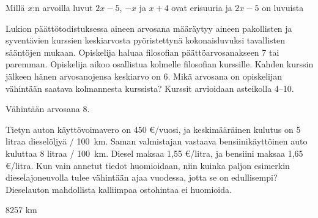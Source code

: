 \begin{tehtavasivu}
\begin{tehtava}
	Millä $x$:n arvoilla luvut $2x - 5$, $-x$ ja $x + 4$ ovat erisuuria ja $2x - 5$ on luvuista
	\begin{alakohdat}
	\end{alakohdat}
	\begin{vastaus}
		\begin{alakohdat}
			\alakohta{$x > 9$}
			\alakohta{$\frac{5}{3} < x < 9$}
			\alakohta{$x < \frac{5}{3}$}
		\end{alakohdat}
	\end{vastaus}
\end{tehtava}

\begin{tehtava}
Lukion päättötodistuksessa aineen arvosana määräytyy aineen pakollisten ja syventävien kurssien keskiarvosta pyöristettynä kokonaisluvuksi tavallisten 
sääntöjen mukaan. Opiskelija haluaa filosofian päättöarvosanakseen 7 tai paremman. Opiskelija aikoo osallistua kolmelle filosofian kurssille. Kahden 
kurssin jälkeen hänen arvosanojensa keskiarvo on 6. Mikä arvosana on opiskelijan vähintään saatava kolmannesta kurssista? Kurssit arvioidaan asteikolla 
4--10.
\begin{vastaus}
Vähintään arvosana 8.
\end{vastaus}
\end{tehtava}

\begin{tehtava}
	Tietyn auton käyttövoimavero on 450 \euro /vuosi, ja keskimääräinen kulutus on 5 litraa dieselöljyä / 100~km. Saman valmistajan vastaava bensiinikäyttöinen auto kuluttaa 8 litraa / 100~km. Diesel maksaa 1,55 \euro /litra, ja bensiini maksaa 1,65 \euro /litra. Kun vain annetut tiedot huomioidaan, niin kuinka paljon esimerkin dieselajoneuvolla tulee vähintään ajaa vuodessa, jotta se on edullisempi? Dieselauton mahdollista kalliimpaa ostohintaa ei huomioida.
    \begin{vastaus}
        8257 km
    \end{vastaus}
\end{tehtava}

\end{tehtavasivu}
